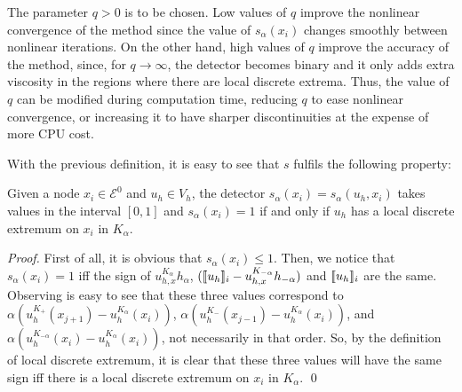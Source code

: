 \begin{remark}
The parameter $q>0$ is to be chosen. { Low values of $q$ improve the nonlinear convergence of the method since the value of $s_\alpha(x_i)$ changes smoothly between nonlinear iterations. On the other hand, high values of $q$ improve the accuracy of the method, since, for $q\longrightarrow \infty$, the detector becomes binary and it only adds extra viscosity in the regions where there are local discrete extrema.} {Thus, the value of $q$ can be modified during computation time, reducing $q$ to ease nonlinear convergence, or increasing it to have sharper discontinuities at the expense of more CPU cost.} 
\end{remark}

With the previous definition, it is easy to see that $s$ fulfils the following property:
\begin{lemma}\label{lem-sc}
Given a node $x_i\in\mathcal{E}^0$ and $u_h\in V_h$, the detector $s_\alpha(x_i) = s_\alpha(u_h,x_i)$ takes values in the interval $ [0,1]$ and $s_\alpha(x_i) =1$ if and only if $u_h$ has a local discrete extremum on $x_i$ in $K_\alpha$.
\end{lemma}
\begin{proof}
First of all, it is obvious that $s_\alpha(x_i)\leq 1$. Then, we notice that $s_\alpha(x_i)=1$ iff the sign of $u_{h,x}^{K_\alpha} h_\alpha$, $(\lbrack\!\lbrack u_h \rbrack\!\rbrack_i - u_{h,x}^{K_{-\alpha}}h_{{-\alpha}})$ and $\lbrack\!\lbrack u_h \rbrack\!\rbrack_i$ are the same. Observing  is easy to see that these three values correspond to { $\alpha (u_h^{K_+}(x_{j+1}) - u_h^{K_\alpha}(x_i))$, $\alpha(u_h^{K_-}(x_{j-1}) - u_h^{K_\alpha}(x_i))$, and $\alpha(u_h^{K_{-\alpha}}(x_i)- u_h^{K_\alpha}(x_i))$}, not necessarily in that order. So, by the definition of local discrete extremum, it is clear that these three values will have the same sign iff there is a local discrete extremum on $x_i$ in $K_\alpha$. \qed
\end{proof}

